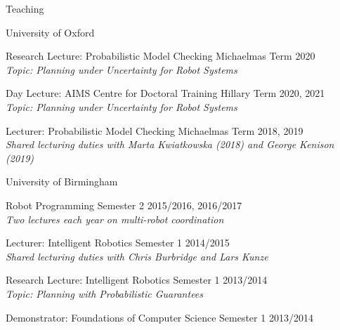 
\begin{rSection}{Teaching}

\begin{rSubsection}{University of Oxford}{}{}{}
\item Research Lecture: Probabilistic Model Checking   \hfill Michaelmas Term 2020\\
\textit{Topic: Planning under Uncertainty for Robot Systems }
\item Day Lecture: AIMS Centre for Doctoral Training   \hfill Hillary Term 2020, 2021\\
\textit{Topic: Planning under Uncertainty for Robot Systems }
\item Lecturer: Probabilistic Model Checking  \hfill Michaelmas Term 2018, 2019\\
\textit{Shared lecturing duties with Marta Kwiatkowska (2018) and George Kenison (2019)}
\end{rSubsection}

\begin{rSubsection}{University of Birmingham}{}{}{}
\item Robot Programming  \hfill Semester 2 2015/2016, 2016/2017\\
\textit{Two lectures each year on multi-robot coordination}
\item Lecturer: Intelligent Robotics \hfill Semester 1 2014/2015\\
\textit{Shared lecturing duties with Chris Burbridge and Lars Kunze}
\item Research Lecture: Intelligent Robotics \hfill Semester 1 2013/2014\\
\textit{Topic: Planning with Probabilistic Guarantees }
\item Demonstrator: Foundations of Computer Science \hfill Semester 1 2013/2014
\end{rSubsection}



\end{rSection}
